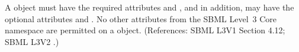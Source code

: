 A \Trigger object must have the required attributes
 and , and in addition, may have the
optional attributes   and .  No other
attributes from the SBML Level~3 Core namespace are permitted on a \Trigger
object.  (References: SBML L3V1 Section 4.12; SBML L3V2 .)
